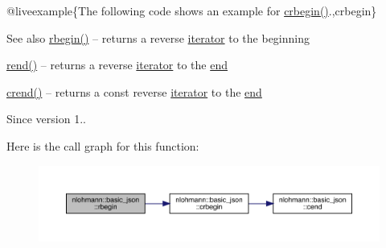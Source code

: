 @liveexample\{The following code shows an example for {\ttfamily \mbox{\hyperlink{classnlohmann_1_1basic__json_a1e0769d22d54573f294da0e5c6abc9de}{crbegin()}}}.,crbegin\}

\begin{DoxySeeAlso}{See also}
\mbox{\hyperlink{classnlohmann_1_1basic__json_a1ef93e2006dbe52667294f5ef38b0b10}{rbegin()}} -- returns a reverse \mbox{\hyperlink{classnlohmann_1_1basic__json_a099316232c76c034030a38faa6e34dca}{iterator}} to the beginning 

\mbox{\hyperlink{classnlohmann_1_1basic__json_ac77aed0925d447744676725ab0b6d535}{rend()}} -- returns a reverse \mbox{\hyperlink{classnlohmann_1_1basic__json_a099316232c76c034030a38faa6e34dca}{iterator}} to the \mbox{\hyperlink{classnlohmann_1_1basic__json_a13e032a02a7fd8a93fdddc2fcbc4763c}{end}} 

\mbox{\hyperlink{classnlohmann_1_1basic__json_a5795b029dbf28e0cb2c7a439ec5d0a88}{crend()}} -- returns a const reverse \mbox{\hyperlink{classnlohmann_1_1basic__json_a099316232c76c034030a38faa6e34dca}{iterator}} to the \mbox{\hyperlink{classnlohmann_1_1basic__json_a13e032a02a7fd8a93fdddc2fcbc4763c}{end}}
\end{DoxySeeAlso}
\begin{DoxySince}{Since}
version 1.. 
\end{DoxySince}
Here is the call graph for this function\+:\nopagebreak
\begin{figure}[H]
\begin{center}
\leavevmode
\includegraphics[width=350pt]{classnlohmann_1_1basic__json_a515e7618392317dbf4b72d3e18bf2ab2_cgraph}
\end{center}
\end{figure}
\mbox{\label{classnlohmann_1_1basic__json_ac77aed0925d447744676725ab0b6d535}} 
